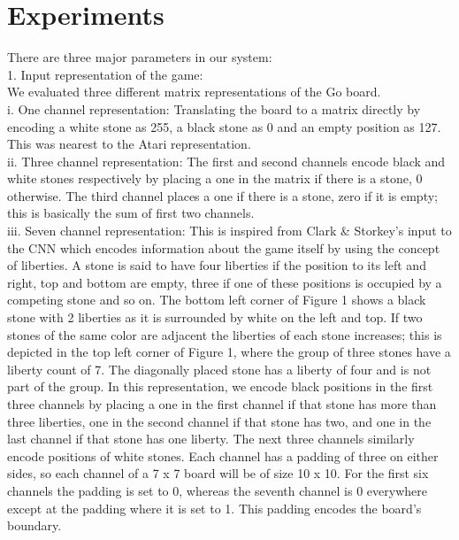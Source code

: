 \section{Experiments}
There are three major parameters in our system:
\\
1. Input representation of the game:
\\
We evaluated three different matrix representations of the Go board.
\\
i. One channel representation: Translating the board to a matrix directly by encoding a white stone as 255, a black stone as 0 and an empty position as 127. This was nearest to the Atari representation.
\\ii. Three channel representation: The first and second channels encode black and white stones respectively by placing a one in the matrix if there is a stone, 0 otherwise. The third channel places a one if there is a stone, zero if it is empty; this is basically the sum of first two channels.
\\
iii. Seven channel representation: This is inspired from Clark \& Storkey's input to the CNN which encodes information about the game itself by using the concept of liberties. A stone is said to have four liberties if the position to its left and right, top and bottom are empty, three if one of these positions is occupied by a competing stone and so on. The bottom left corner of Figure 1 shows a black stone with 2 liberties as it is surrounded by white on the left and top. If two stones of the same color are adjacent the liberties of each stone increases; this is depicted in the top left corner of Figure 1, where the group of three stones have a liberty count of 7. The diagonally placed stone has a liberty of four and is not part of the group. In this representation, we encode black positions in the first three channels by placing a one in the first channel if that stone has more than three liberties, one in the second channel if that stone has two, and one in the last channel if that stone has one liberty. The next three channels similarly encode positions of white stones. Each channel has a padding of three on either sides, so each channel of a 7 x 7 board will be of size 10 x 10. For the first six channels the padding is set to 0, whereas the seventh channel is 0 everywhere except at the padding where it is set to 1. This padding encodes the board's boundary.
\\
